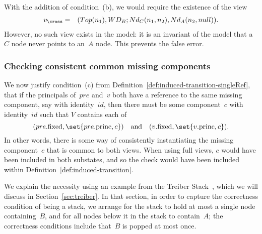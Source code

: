 With the addition of condition~(b), we would require the existence of the view
\begin{eqnarray*}
v_\cross & = &  (Top(n_1), WD_B ; Nd_C(n_1, n_2), Nd_A(n_2, null)).
\end{eqnarray*}
%
However, no such view exists in the model: it is an invariant of the model
that a $C$ node never points to an~$A$ node.  This prevents the false error.




\subsubsection{Checking consistent common missing components}
\label{ssec:missing-common}

We now justify condition~(c) from
Definition~\ref{def:induced-transition-singleRef}, that if the principals
of~$pre$ and~$v$ both have a reference to the same missing component, say with
identity~$id$, then there must be some component~$c$ with identity~$id$ such
that $V$ contains each of
\[
(pre.\fixed, \set{pre.\princ, c}) \quad\mbox{and}\quad 
(v.\fixed, \set{v.\princ, c}).
\]
In other words, there is some way of consistently instantiating the missing
component~$c$ that is common to both views. When using full views,
$c$ would have been included in both substates, and so the check would have
been included within Definition~\ref{def:induced-transition}.



We explain the necessity using an example from the Treiber
Stack~\cite{treiber}, which we will discuss in Section~\ref{sec:treiber}.  In
that section, in order to capture the correctness condition of being a stack,
we arrange for the stack to hold at most a single node containing~$B$, and for
all nodes below it in the stack to contain~$A$; the correctness conditions
include that~$B$ is popped at most once.

